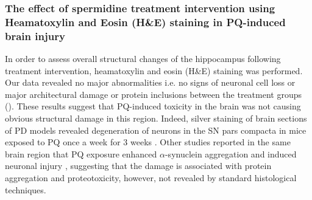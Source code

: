 \subsubsection{The effect of spermidine treatment intervention using Heamatoxylin and Eosin (H\&E) staining in PQ-induced brain injury}
In order to assess overall structural changes of the hippocampus following treatment intervention, heamatoxylin and eosin (H\&E) staining was performed. Our data revealed no major abnormalities i.e. no signs of neuronal cell loss or major architectural damage or protein inclusions between the treatment groups (). These results suggest that PQ-induced toxicity in the brain was not causing obvious structural damage in this region. Indeed, silver staining of brain sections of PD models revealed degeneration of neurons in the SN pars compacta in mice exposed to PQ once a week for 3 weeks \citep{McCormack2002}. Other studies reported in the same brain region that PQ exposure enhanced $\alpha$-synuclein aggregation \citep{Manning-Bog2002} and induced neuronal injury \citep{Manning-Bog2003}, suggesting that the damage is associated with protein aggregation and proteotoxicity, however, not revealed by standard histological techniques.

